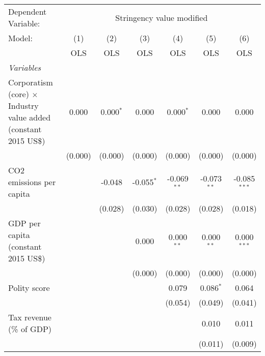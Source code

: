 
\begingroup
\centering
\begin{tabular}{lcccccc}
   \toprule
   Dependent Variable: & \multicolumn{6}{c}{Stringency value modified}\\
   Model:                                                                  & (1)     & (2)         & (3)          & (4)           & (5)           & (6)\\  
                                                                           &  OLS    & OLS         & OLS          & OLS           & OLS           & OLS\\  
   \midrule
   \emph{Variables}\\
   Corporatism (core) $\times$ Industry value added (constant 2015 US\$)   & 0.000   & 0.000$^{*}$ & 0.000        & 0.000$^{*}$   & 0.000         & 0.000\\   
                                                                           & (0.000) & (0.000)     & (0.000)      & (0.000)       & (0.000)       & (0.000)\\   
   CO2 emissions per capita                                                &         & -0.048      & -0.055$^{*}$ & -0.069$^{**}$ & -0.073$^{**}$ & -0.085$^{***}$\\   
                                                                           &         & (0.028)     & (0.030)      & (0.028)       & (0.028)       & (0.018)\\   
   GDP per capita (constant 2015 US\$)                                     &         &             & 0.000        & 0.000$^{**}$  & 0.000$^{**}$  & 0.000$^{***}$\\   
                                                                           &         &             & (0.000)      & (0.000)       & (0.000)       & (0.000)\\   
   Polity score                                                            &         &             &              & 0.079         & 0.086$^{*}$   & 0.064\\   
                                                                           &         &             &              & (0.054)       & (0.049)       & (0.041)\\   
   Tax revenue (\% of GDP)                                                 &         &             &              &               & 0.010         & 0.011\\   
                                                                           &         &             &              &               & (0.011)       & (0.009)\\   

\end{tabular}
